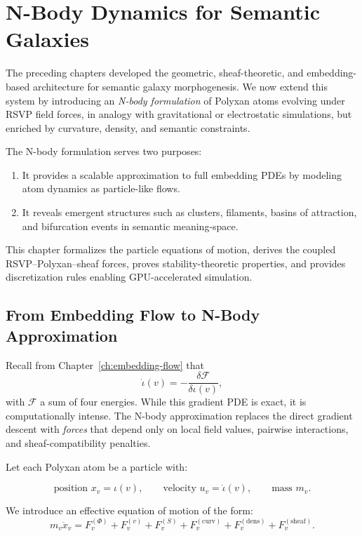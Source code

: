 \chapter{N-Body Dynamics for Semantic Galaxies}
\label{ch:nbody}

The preceding chapters developed the geometric, sheaf-theoretic,
and embedding-based architecture for semantic galaxy morphogenesis.
We now extend this system by introducing an \emph{N-body formulation}
of Polyxan atoms evolving under RSVP field forces,
in analogy with gravitational or electrostatic simulations,
but enriched by curvature, density, and semantic constraints.

The N-body formulation serves two purposes:

\begin{enumerate}
\item It provides a scalable approximation to full embedding PDEs
      by modeling atom dynamics as particle-like flows.
\item It reveals emergent structures such as clusters, filaments,
      basins of attraction, and bifurcation events
      in semantic meaning-space.
\end{enumerate}

This chapter formalizes the particle equations of motion,
derives the coupled RSVP--Polyxan–sheaf forces,
proves stability-theoretic properties,
and provides discretization rules enabling GPU-accelerated simulation.


\section{From Embedding Flow to N-Body Approximation}

Recall from Chapter~\ref{ch:embedding-flow} that
\[
  \dot\iota(v)
    = -\frac{\delta\mathcal{F}}{\delta\iota(v)},
\]
with $\mathcal{F}$ a sum of four energies.
While this gradient PDE is exact, it is computationally intense.
The N-body approximation replaces the direct gradient descent
with \emph{forces} that depend only on local field values, pairwise
interactions, and sheaf-compatibility penalties.

Let each Polyxan atom be a particle with:

\[
  \text{position } x_v = \iota(v), \qquad
  \text{velocity } u_v = \dot\iota(v), \qquad
  \text{mass } m_v.
\]

We introduce an effective equation of motion of the form:
\[
  m_v \ddot{x}_v = 
    F^{(\Phi)}_v
  + F^{(v)}_v
  + F^{(S)}_v
  + F^{(\mathrm{curv})}_v
  + F^{(\mathrm{dens})}_v
  + F^{(\mathrm{sheaf})}_v.
\]

